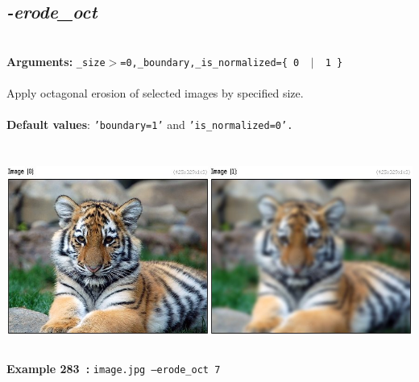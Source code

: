 \documentclass[a4paper,11pt,twoside]{book}
\begin{document}
\subsection{\emph{-erode\_oct} }\vspace*{-0.5em}
~\\\textbf{Arguments: } 
{\small \texttt{\_size$>$=0,\_boundary,\_is\_normalized=\{ 0 ~$|$~ 1 \}}}\\~\\
Apply octagonal erosion of selected images by specified size.
~\\~\\\textbf{Default values}: {\small \texttt{'boundary=1'} and \texttt{'is\_normalized=0'.}}
\begin{center}\includegraphics[keepaspectratio=true,height=7cm,width=\textwidth]{img/gmic_def283.jpg}\\
{\footnotesize \textbf{Example 283~:} \texttt{image.jpg --erode\_oct 7}}
\end{center}
\end{document}
